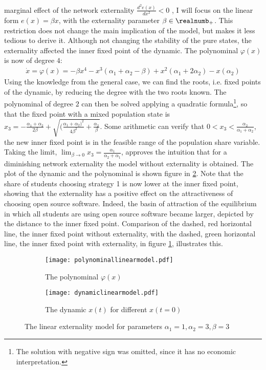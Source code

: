 marginal effect of the network externality $\frac{d^2e(x)}{dx^2} <0$ 
\parencite[73]{lin_impact_2008}, I will 
focus on the linear form $e(x) = \beta x$, with the externality parameter
$\beta \in \realnumb_+$. This restriction does not change the main implication
of the model, but makes it less tedious to derive it.
Although not changing the stability of the pure states, 
the externality affected the inner fixed point of the dynamic.
The polynominal $\varphi(x)$ is now of degree $4$:
\begin{align}
        \dot{x} = \varphi(x) = -\beta x^4 -x^3(\alpha_1 + \alpha_2 
        - \beta ) + x^2 (\alpha_1 + 2 \alpha_2) - x(\alpha_2)
\end{align}
Using the knowledge from the general case, we can find the roots, i.e. fixed
points of the dynamic, by reducing the degree with the two roots known. The
polynominal of degree $2$ can then be solved applying a quadratic formula\footnote{
The solution with negative sign was omitted, since it has no economic 
interpretation.}, so that the fixed point with a mixed population state is
$x_3 = -\frac{\alpha_1+\alpha_2}{2 \beta} + 
\sqrt{(\frac{\alpha_1+\alpha_2)^2}{4\beta^2} +\frac{\alpha_2}{\beta}}$. 
Some arithmetic can verify that $0<x_3<\frac{\alpha_2}{\alpha_1+\alpha_2}$, 
the new inner fixed point is in the feasible range of the population share 
variable.
Taking the limit, $\lim_{\beta \rightarrow 0} x_3 = 
\frac{\alpha_1}{\alpha_2+\alpha_1}$, approves the intuition that for a 
diminishing network externality the model without externality is obtained.
The plot of the dynamic and the polynominal is 
shown figure in \ref{fig:plotmodellinear}.
Note that the share of students choosing strategy 1 is now lower at the 
inner fixed point, showing that the externality has a positive 
effect on the attractiveness of choosing open source software. Indeed,
the basin of attraction of the equilibrium in which all students are using 
open source software became larger, depicted by the distance to the
inner fixed point.
Comparison of the dashed, red horizontal line, the inner fixed point without 
externality, with the dashed, green horizontal line, the inner fixed point 
with externality, in figure \ref{fig:dynamiclinear}, illustrates this. 
\begin{figure}[h]
        \centering
        \begin{subfigure}{.5\textwidth}
        \centering
        \texttt{[image: polynominallinearmodel.pdf]}
        \caption[Polynominal of the externality model]{The polynominal $\varphi(x)$} 
        \end{subfigure}%
        \begin{subfigure}{.5\textwidth}
        \centering
        \texttt{[image: dynamiclinearmodel.pdf]}
        \caption[Replicator dynamic of the model with externality]{The dynamic $x(t)$ for different $x(t=0)$} 
        \label{fig:dynamiclinear}
        \end{subfigure}%
        \caption[Polynominal and Dynamic of the model with externality]{The linear externality model for parameters $\alpha_1=1,\alpha_2=3,
        \beta=3$}
        \label{fig:plotmodellinear}
\end{figure}
